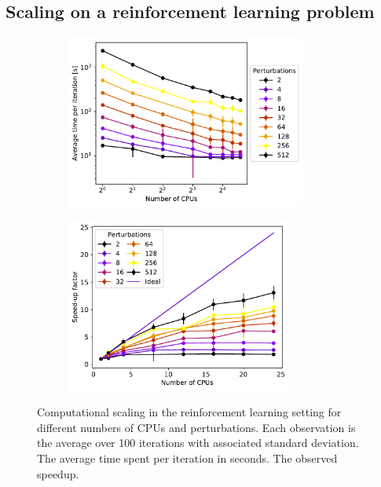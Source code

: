 \subsection{Scaling on a reinforcement learning problem}
\begin{figure}[tbp!]
    \begin{subfigure}[b]{0.504\textwidth}
        \centering
        \includegraphics[height=5.7cm]{graphics/E011-sca-analysis/E011-scaling-02.pdf}
        \caption{}
        \label{fig: Theory: E011-scaling-supervised-02}
    \end{subfigure}
    \hfill
    \begin{subfigure}[b]{0.486\textwidth}
        \centering
        \includegraphics[height=5.7cm]{graphics/E011-sca-analysis/E011-scaling-04.pdf}
        \caption{}
        \label{fig: Theory: E011-scaling-supervised-04}
    \end{subfigure}
    \caption{
        Computational scaling in the reinforcement learning setting for different numbers of \glspl{CPU} and perturbations. Each observation is the average over 100 iterations with associated standard deviation.
         The average time spent per iteration in seconds.
         The observed speedup.
    }
    \label{fig: Theory: E011-scaling-supervised}
\end{figure}


